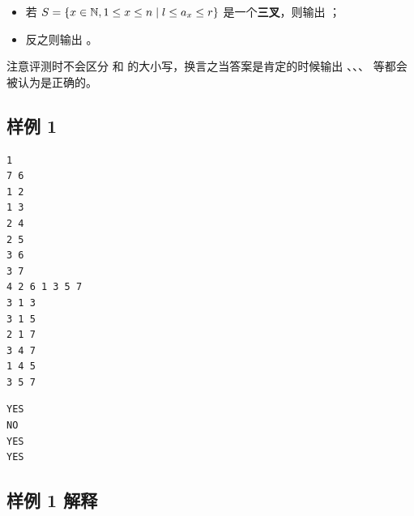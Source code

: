 \begin{itemize}
	\item 若 $S=\{x \in \mathbb{N}, 1\le x \le n \mid l\le a_x\le r\}$ 是一个\textbf{三叉}，则输出 ；
	\item 反之则输出 。
\end{itemize}

注意评测时不会区分  和  的大小写，换言之当答案是肯定的时候输出 、、、 等都会被认为是正确的。


\subsection{样例 1}

\begin{minipage}{\linewidth}
\begin{minipage}[t]{0.49\linewidth}
\begin{lstlisting}[title=\texttt{standard input}]
1
7 6
1 2
1 3
2 4
2 5
3 6
3 7
4 2 6 1 3 5 7
3 1 3
3 1 5
2 1 7
3 4 7
1 4 5
3 5 7
\end{lstlisting}
\end{minipage}
\hfill
\begin{minipage}[t]{0.49\linewidth}
\begin{lstlisting}[title=\texttt{standard output}]
YES
NO
YES
YES
\end{lstlisting}
\end{minipage}
\end{minipage}

\subsection{样例 1 解释}

